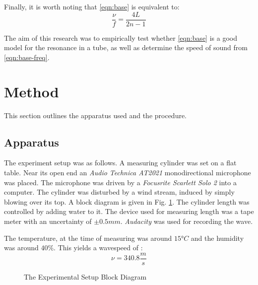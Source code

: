 \documentclass[conference]{IEEEtran}
\begin{document}
Finally, it is worth noting that \eqref{eqn:base} is equivalent to:
\begin{equation}\label{eqn:base-freq}
    \frac{\nu}{f} = \frac{4L}{2n - 1}
\end{equation}

The aim of this research was to empirically test whether \eqref{eqn:base} is a
good model for the resonance in a tube, as well as determine the speed of sound
from \eqref{eqn:base-freq}.

\section{Method}

This section outlines the apparatus used and the procedure.

\subsection{Apparatus}

The experiment setup was as follows. A measuring cylinder was set on a flat
table. Near its open end an \textit{Audio Technica AT2021}\cite{at2021}
monodirectional microphone was placed. The microphone was driven by a
\textit{Focusrite Scarlett Solo 2}\cite{focusrite} into a computer. The
cylinder was disturbed by a wind stream, induced by simply blowing over its
top. A block diagram is given in Fig. \ref{fig:block-diagram}. The cylinder
length was controlled by adding water to it. The device used for measuring
length was a tape meter with an uncertainty of $\pm 0.5\si{mm}$.
\textit{Audacity}\cite{audacity} was used for recording the wave.

The temperature, at the time of measuring was around $\ang{15}C$ and the
humidity was around $40\%$. This yields a wavespeed of \cite{sostbl}:
\begin{equation*}
    \nu = 340.8 \si{\frac{m}{s}}
\end{equation*}

\begin{figure}[b!]
    \centering
    \caption{The Experimental Setup Block Diagram}
    \label{fig:block-diagram}
\end{figure}
\end{document}
